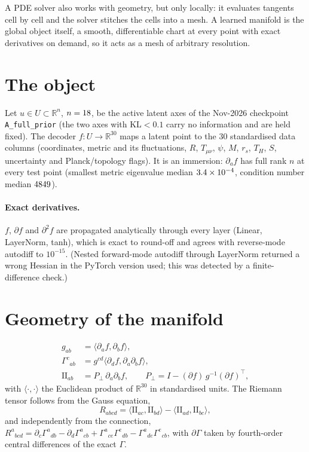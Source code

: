 \documentclass[10pt,twocolumn]{article}
\begin{document}
A PDE solver also works with geometry, but only locally: it evaluates tangents cell by cell and
the solver stitches the cells into a mesh. A learned manifold is the global object itself, a
smooth, differentiable chart at every point with exact derivatives on demand, so it acts as a
mesh of arbitrary resolution.

\section{The object}
Let $u\in U\subset\mathbb{R}^{n}$, $n=18$, be the active latent axes of the Nov-2026 checkpoint
\texttt{A\_full\_prior} (the two axes with KL$<0.1$ carry no information and are held fixed). The
decoder $f:U\to\mathbb{R}^{30}$ maps a latent point to the 30 standardised data columns
(coordinates, metric and its fluctuations, $R$, $T_{\mu\nu}$, $\psi$, $M$, $r_s$, $T_H$, $S$,
uncertainty and Planck/topology flags). It is an immersion: $\partial_a f$ has full rank $n$ at
every test point (smallest metric eigenvalue median $3.4\times10^{-4}$, condition number median $4849$).

\paragraph{Exact derivatives.} $f$, $\partial f$ and $\partial^2 f$ are propagated analytically
through every layer (Linear, LayerNorm, tanh), which is exact to round-off and agrees with
reverse-mode autodiff to $10^{-15}$. (Nested forward-mode autodiff through LayerNorm returned a
wrong Hessian in the PyTorch version used; this was detected by a finite-difference check.)

\section{Geometry of the manifold}
\begin{align}
g_{ab} &= \langle\partial_a f,\partial_b f\rangle, \label{eq:g}\\
\Gamma^{c}{}_{ab} &= g^{cd}\langle\partial_d f,\partial_a\partial_b f\rangle, \label{eq:gam}\\
\mathrm{II}_{ab} &= P_\perp\,\partial_a\partial_b f,\qquad P_\perp = I - (\partial f)\,g^{-1}(\partial f)^{\!\top},\label{eq:II}
\end{align}
with $\langle\cdot,\cdot\rangle$ the Euclidean product of $\mathbb{R}^{30}$ in standardised units.
The Riemann tensor follows from the Gauss equation,
\begin{equation}
R_{abcd}=\langle\mathrm{II}_{ac},\mathrm{II}_{bd}\rangle-\langle\mathrm{II}_{ad},\mathrm{II}_{bc}\rangle,
\label{eq:gauss}
\end{equation}
and independently from the connection,
$R^{a}{}_{bcd}=\partial_c\Gamma^a{}_{db}-\partial_d\Gamma^a{}_{cb}+\Gamma^a{}_{ce}\Gamma^e{}_{db}-\Gamma^a{}_{de}\Gamma^e{}_{cb}$,
with $\partial\Gamma$ taken by fourth-order central differences of the exact $\Gamma$.
\end{document}
